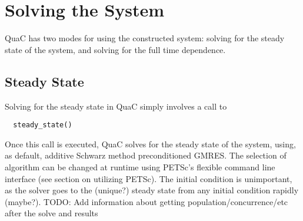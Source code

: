\documentclass{article}
\begin{document}
\section{Solving the System}
QuaC has two modes for using the constructed system: solving for the steady state of the system,
and solving for the full time dependence.
\subsection{Steady State}
Solving for the steady state in QuaC simply involves a call to
\begin{lstlisting}
  steady_state()
\end{lstlisting}
Once this call is executed, QuaC solves for the steady state of the system, using, as default,
additive Schwarz method preconditioned GMRES. The selection of algorithm can be changed
at runtime using PETSc's flexible command line interface (see section on utilizing
PETSc). The initial condition is unimportant, as the solver goes to the
(unique?) steady state from any initial condition rapidly (maybe?).
TODO: Add information about getting population/concurrence/etc after the solve and results
\end{document}
